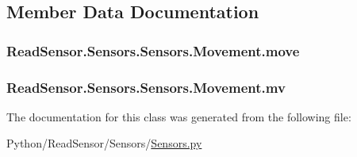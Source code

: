 \subsection{Member Data Documentation}
\subsubsection[{\texorpdfstring{move}{move}}]{\setlength{\rightskip}{0pt plus 5cm}Read\+Sensor.\+Sensors.\+Sensors.\+Movement.\+move}\hypertarget{classReadSensor_1_1Sensors_1_1Sensors_1_1Movement_afca15a3e5b7fd64c76fb803340cff411}{}\label{classReadSensor_1_1Sensors_1_1Sensors_1_1Movement_afca15a3e5b7fd64c76fb803340cff411}
\subsubsection[{\texorpdfstring{mv}{mv}}]{\setlength{\rightskip}{0pt plus 5cm}Read\+Sensor.\+Sensors.\+Sensors.\+Movement.\+mv}\hypertarget{classReadSensor_1_1Sensors_1_1Sensors_1_1Movement_a7004579e8312dd94942ff029d65f7586}{}\label{classReadSensor_1_1Sensors_1_1Sensors_1_1Movement_a7004579e8312dd94942ff029d65f7586}


The documentation for this class was generated from the following file\+:\begin{DoxyCompactItemize}
\item 
Python/\+Read\+Sensor/\+Sensors/\hyperlink{Sensors_8py}{Sensors.\+py}\end{DoxyCompactItemize}
